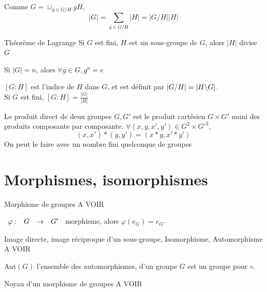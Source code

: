 \documentclass[]{report}
\begin{document}
\begin{cor}{}{}
    Comme $G=\sqcup_{\overline{g}\in G/H} gH$, 
    \[\left|G\right|=\sum_{\overline{g}\in G/H} \left|H\right|= \left|G/H\right||H|\]
\end{cor}

\begin{tm}{Théorème de Lagrange}{}
    Si $G$ est fini, $H$ est un sous-groupe de $G$, alors $|H|$ divise $G$
\end{tm}

\begin{cor}{}{}
    Si $|G|=n$, alors $\forall g\in G, g^n=e$
\end{cor}

\begin{df}{}{}
    $[G:H]$ est l'indice de $H$ dans $G$, et est définit par $|G/H|=|H\backslash G|$.\\
    Si $G$ est fini, $[G:H]=\frac{|G|}{|H|}$
\end{df}

\begin{df}{}{}
    Le produit direct de deux groupes $G,G'$ est le produit cartésien $G\times G'$ muni des produits composante par composante. $\forall (x,y,x',y')\in G^2\times G'^2$,
    \[(x,x')*(y,y')=(x*y,x'*y')\]
    On peut le faire avec un nombre fini quelconque de groupes
\end{df}

\section{Morphismes, isomorphismes}

\begin{df}{Morphisme de groupes}{}
    A VOIR
\end{df}

\begin{re}{}{}
    $\begin{array}{ccccc} \varphi : & G & \to & G' \end{array}$ morphisme, alors $\varphi(e_G)=e_{G'}$
\end{re}

\begin{df}{Image directe, image réciproque d'un sous-groupe, Isomorphisme, Automorphisme}{}
    A VOIR
\end{df}

\begin{prop}{}{}
    Aut$(G)$ l'ensemble des automorphismes, d'un groupe $G$ est un groupe pour $\circ$.
\end{prop}

\begin{df}{Noyau d'un morphisme de groupes}{}
    A VOIR
\end{df}
\end{document}
